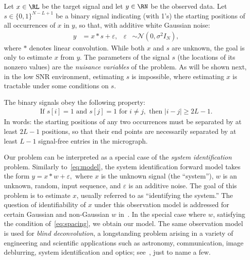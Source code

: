 \documentclass[9pt,twocolumn,twoside,lineno]{pnas-new}
\begin{document}
Let $x\in\RL$ be the target signal and let $y\in\RN$ be the observed data. Let  $s \in \{0, 1\}^{N-L+1}$ be a binary signal indicating (with 1's) the starting positions of all occurrences of $x$ in $y$, so that, with additive white Gaussian noise:
\begin{align}
y & =  x \ast s + \varepsilon, & \varepsilon & \sim \mathcal{N}(0,\sigma^2 I_N),
\label{eq:model}
\end{align}
where $\ast$ denotes linear convolution. 
While both $x$ and $s$ are unknown, the goal is only to estimate $x$ from $y$. The parameters of the signal $s$ (the locations of its nonzero values) are the \emph{nuisance variables} of the problem. As will be shown next, in the low SNR environment, estimating $s$ is impossible, where estimating $x$ is tractable under some conditions on $s$. 

The binary signals obey the following property:
\begin{align} 
\textrm{If } s[i] = 1 \textrm{ and } s[j] = 1 \textrm{ for } i \neq j, \textrm{ then } |i - j| \geq 2L-1.
\label{eq:spacing}
\end{align}
In words: the starting positions of any two occurrences  must be separated by at least $2L-1$ positions, so that their end points are necessarily separated by at least $L-1$ signal-free entries in the micrograph.

Our problem can be interpreted as a special case of the \emph{system identification} problem. Similarly to~\eqref{eq:model}, the system identification forward model takes the form
%
\begin{math}
%
y = x\ast w + \varepsilon,  
%
\end{math} 
%
where $x$ is the unknown signal (the ``system''), $w$ is an unknown, random, input sequence, and $\varepsilon$ is an additive noise.   
The goal of this problem is to estimate $x$, usually referred to as ``identifying the system.'' The question of identifiability of $x$ under this observation model is addressed for certain Gaussian and non-Gaussian $w$ in~\cite{benveniste1980robust,kormylo1983identifiability}. In the special case where $w$, satisfying the condition of~\eqref{eq:spacing}, we obtain our model. The same observation model is used for \emph{blind deconvolution}, a longstanding problem arising in a variety of engineering and scientific applications such as astronomy, communication, image deblurring, system identification and optics; see~\cite{jefferies1993restoration,shalvi1990new,ayers1988iterative,abed1997blind}, just to name a few. 
\end{document}
